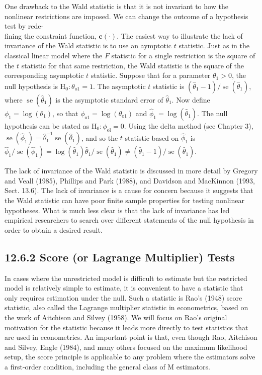 \documentclass[10pt]{article}
\begin{document}
One drawback to the Wald statistic is that it is not invariant to how the nonlinear restrictions are imposed. We can change the outcome of a hypothesis test by rede-\\
fining the constraint function, $\mathbf{c}(\cdot)$. The easiest way to illustrate the lack of invariance of the Wald statistic is to use an aymptotic $t$ statistic. Just as in the classical linear model where the $F$ statistic for a single restriction is the square of the $t$ statistic for that same restriction, the Wald statistic is the square of the corresponding asymptotic $t$ statistic. Suppose that for a parameter $\theta_{1}>0$, the null hypothesis is $\mathrm{H}_{0}: \theta_{\mathrm{o} 1}=1$. The asymptotic $t$ statistic is $\left(\hat{\theta}_{1}-1\right) / \operatorname{se}\left(\hat{\theta}_{1}\right)$, where $\operatorname{se}\left(\hat{\theta}_{1}\right)$ is the asymptotic standard error of $\hat{\theta}_{1}$. Now define $\phi_{1}=\log \left(\theta_{1}\right)$, so that $\phi_{\mathrm{o} 1}=\log \left(\theta_{\mathrm{o} 1}\right)$ and $\hat{\phi}_{1}=\log \left(\hat{\theta}_{1}\right)$. The null hypothesis can be stated as $\mathrm{H}_{0}: \phi_{\mathrm{ol}}=0$. Using the delta method (see Chapter 3), $\operatorname{se}\left(\hat{\phi}_{1}\right)=\hat{\theta}_{1}^{-1} \operatorname{se}\left(\hat{\theta}_{1}\right)$, and so the $t$ statistic based on $\hat{\phi}_{1}$ is $\hat{\phi}_{1} / \operatorname{se}\left(\hat{\phi}_{1}\right)=\log \left(\hat{\theta}_{1}\right) \hat{\theta}_{1} / \operatorname{se}\left(\hat{\theta}_{1}\right) \neq\left(\hat{\theta}_{1}-1\right) / \operatorname{se}\left(\hat{\theta}_{1}\right)$.

The lack of invariance of the Wald statistic is discussed in more detail by Gregory and Veall (1985), Phillips and Park (1988), and Davidson and MacKinnon (1993, Sect. 13.6). The lack of invariance is a cause for concern because it suggests that the Wald statistic can have poor finite sample properties for testing nonlinear hypotheses. What is much less clear is that the lack of invariance has led empirical researchers to search over different statements of the null hypothesis in order to obtain a desired result.

\subsection*{12.6.2 Score (or Lagrange Multiplier) Tests}
In cases where the unrestricted model is difficult to estimate but the restricted model is relatively simple to estimate, it is convenient to have a statistic that only requires estimation under the null. Such a statistic is Rao's (1948) score statistic, also called the Lagrange multiplier statistic in econometrics, based on the work of Aitchison and Silvey (1958). We will focus on Rao's original motivation for the statistic because it leads more directly to test statistics that are used in econometrics. An important point is that, even though Rao, Aitchison and Silvey, Engle (1984), and many others focused on the maximum likelihood setup, the score principle is applicable to any problem where the estimators solve a first-order condition, including the general class of M estimators.
\end{document}
